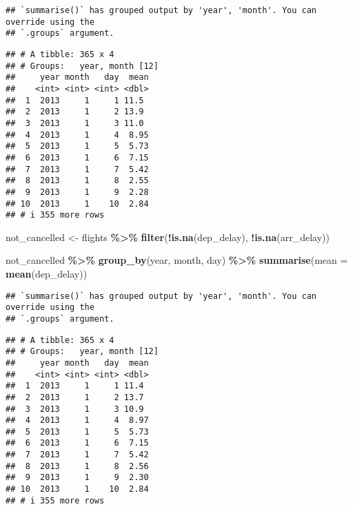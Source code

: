 \documentclass[
]{article}
\newenvironment{Shaded}{\begin{snugshade}}{\end{snugshade}}
\newcommand{\AttributeTok}[1]{\textcolor[rgb]{0.13,0.29,0.53}{#1}}
\newcommand{\FunctionTok}[1]{\textcolor[rgb]{0.13,0.29,0.53}{\textbf{#1}}}
\newcommand{\NormalTok}[1]{#1}
\newcommand{\OtherTok}[1]{\textcolor[rgb]{0.56,0.35,0.01}{#1}}
\newcommand{\SpecialCharTok}[1]{\textcolor[rgb]{0.81,0.36,0.00}{\textbf{#1}}}
\begin{document}
\begin{verbatim}
## `summarise()` has grouped output by 'year', 'month'. You can override using the
## `.groups` argument.
\end{verbatim}

\begin{verbatim}
## # A tibble: 365 x 4
## # Groups:   year, month [12]
##     year month   day  mean
##    <int> <int> <int> <dbl>
##  1  2013     1     1 11.5 
##  2  2013     1     2 13.9 
##  3  2013     1     3 11.0 
##  4  2013     1     4  8.95
##  5  2013     1     5  5.73
##  6  2013     1     6  7.15
##  7  2013     1     7  5.42
##  8  2013     1     8  2.55
##  9  2013     1     9  2.28
## 10  2013     1    10  2.84
## # i 355 more rows
\end{verbatim}

\begin{Shaded}
\begin{Highlighting}[]
\NormalTok{not\_cancelled }\OtherTok{\textless{}{-}}\NormalTok{ flights }\SpecialCharTok{\%\textgreater{}\%} 
  \FunctionTok{filter}\NormalTok{(}\SpecialCharTok{!}\FunctionTok{is.na}\NormalTok{(dep\_delay), }\SpecialCharTok{!}\FunctionTok{is.na}\NormalTok{(arr\_delay))}

\NormalTok{not\_cancelled }\SpecialCharTok{\%\textgreater{}\%} 
  \FunctionTok{group\_by}\NormalTok{(year, month, day) }\SpecialCharTok{\%\textgreater{}\%} 
  \FunctionTok{summarise}\NormalTok{(}\AttributeTok{mean =} \FunctionTok{mean}\NormalTok{(dep\_delay))}
\end{Highlighting}
\end{Shaded}

\begin{verbatim}
## `summarise()` has grouped output by 'year', 'month'. You can override using the
## `.groups` argument.
\end{verbatim}

\begin{verbatim}
## # A tibble: 365 x 4
## # Groups:   year, month [12]
##     year month   day  mean
##    <int> <int> <int> <dbl>
##  1  2013     1     1 11.4 
##  2  2013     1     2 13.7 
##  3  2013     1     3 10.9 
##  4  2013     1     4  8.97
##  5  2013     1     5  5.73
##  6  2013     1     6  7.15
##  7  2013     1     7  5.42
##  8  2013     1     8  2.56
##  9  2013     1     9  2.30
## 10  2013     1    10  2.84
## # i 355 more rows
\end{verbatim}
\end{document}
